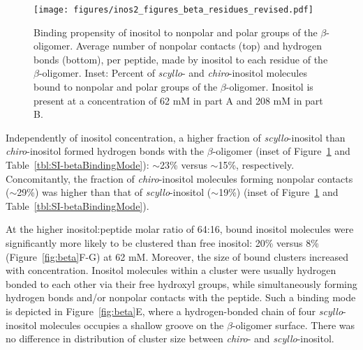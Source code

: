 \begin{figure}
\texttt{[image: figures/inos2\_figures\_beta\_residues\_revised.pdf]}
\caption{Binding propensity of inositol to nonpolar and polar groups of the $\beta$-oligomer. Average number of nonpolar contacts (top) and hydrogen bonds (bottom), per peptide, made by inositol to each residue of the $\beta$-oligomer. Inset: Percent of \emph{scyllo}- and \emph{chiro}-inositol molecules bound to nonpolar and polar groups of the $\beta$-oligomer.  Inositol is present at a concentration of 62 mM in part A and 208 mM in part B.}
\label{fig:beta_residue_binding}
\end{figure}

Independently of inositol concentration, a higher fraction of \emph{scyllo}-inositol than \emph{chiro}-inositol formed hydrogen bonds with the $\beta$-oligomer (inset of Figure~\ref{fig:beta_residue_binding} and Table~\ref{tbl:SI-betaBindingMode}):  $\sim$23\% versus $\sim$15\%, respectively. Concomitantly, the fraction of \emph{chiro}-inositol molecules forming nonpolar contacts ($\sim$29\%) was higher than that of \emph{scyllo}-inositol ($\sim$19\%) (inset of Figure~\ref{fig:beta_residue_binding} and Table~\ref{tbl:SI-betaBindingMode}).

At the higher inositol:peptide molar ratio of 64:16, bound inositol molecules were significantly more likely to be clustered than free inositol: 20\% versus 8\% (Figure~{\ref{fig:beta}}F-G) at 62 mM. Moreover, the size of bound clusters increased with concentration. Inositol molecules within a cluster were usually hydrogen bonded 
to each other via their free hydroxyl groups, while simultaneously forming hydrogen bonds and/or nonpolar contacts with the peptide.  Such a binding mode is depicted in Figure~{\ref{fig:beta}}E, where a hydrogen-bonded chain of four  \emph{scyllo}-inositol molecules occupies a shallow groove on the $\beta$-oligomer surface. %
There was no difference in distribution of cluster size between \emph{chiro}- and \emph{scyllo}-inositol.

